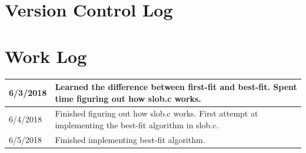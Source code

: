 \documentclass[onecolumn,draftclsnofoot, 10pt, compsoc]{IEEEtran}
\begin{document}
\section{Version Control Log}

\section{Work Log}
	\begin{center}
		\begin{tabular}{ |p{2cm}|p{12cm}| }
			\hline
			6/3/2018 & Learned the difference between first-fit and best-fit. Spent time figuring out how slob.c works. \\
			\hline
			6/4/2018 & Finished figuring out how slob.c works. First attempt at implementing the best-fit algorithm in slob.c. \\
			\hline
			6/5/2018 & Finished implementing best-fit algorithm. \\
			\hline
		\end{tabular}
	\end{center}

\nocite{*}

%

\end{document}
